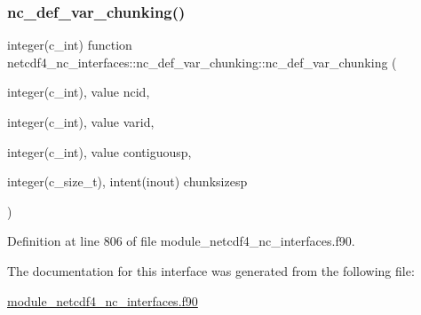 \subsubsection{\texorpdfstring{nc\+\_\+def\+\_\+var\+\_\+chunking()}{nc\_def\_var\_chunking()}}
{\footnotesize\ttfamily integer(c\+\_\+int) function netcdf4\+\_\+nc\+\_\+interfaces\+::nc\+\_\+def\+\_\+var\+\_\+chunking\+::nc\+\_\+def\+\_\+var\+\_\+chunking (\begin{DoxyParamCaption}\item[{integer(c\+\_\+int), value}]{ncid,  }\item[{integer(c\+\_\+int), value}]{varid,  }\item[{integer(c\+\_\+int), value}]{contiguousp,  }\item[{integer(c\+\_\+size\+\_\+t), intent(inout)}]{chunksizesp }\end{DoxyParamCaption})}



Definition at line 806 of file module\+\_\+netcdf4\+\_\+nc\+\_\+interfaces.\+f90.



The documentation for this interface was generated from the following file\+:\begin{DoxyCompactItemize}
\item 
\hyperlink{module__netcdf4__nc__interfaces_8f90}{module\+\_\+netcdf4\+\_\+nc\+\_\+interfaces.\+f90}\end{DoxyCompactItemize}

